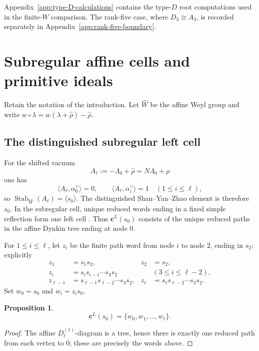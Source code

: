 \documentclass[11pt]{amsart}
\newtheorem{proposition}[theorem]{Proposition}
\theoremstyle{remark}
\numberwithin{equation}{section}
\begin{document}
Appendix~\ref{app:type-D-calculations} contains the type-\(D\) root
computations used in the finite-\(W\) comparison.  The rank-five case, where
\(D_3\cong A_3\), is recorded separately in
Appendix~\ref{app:rank-five-boundary}.

\section{Subregular affine cells and primitive ideals}
\label{sec:subregular-primitive}

Retain the notation of the introduction.  Let \(\widehat W\) be the affine
Weyl group and write
\(w\circ\lambda=w(\lambda+\widehat\rho)-\widehat\rho\).

\subsection{The distinguished subregular left cell}

For the shifted vacuum
\[
   A_\ell:=-\Lambda_0+\widehat\rho=N\Lambda_0+\rho
\]
one has
\[
   \langle A_\ell,\alpha_0^\vee\rangle=0,
   \qquad
   \langle A_\ell,\alpha_i^\vee\rangle=1\quad(1\le i\le\ell),
\]
so \(\operatorname{Stab}_{\widehat W}(A_\ell)=\langle s_0\rangle\).  The
distinguished Shan--Yan--Zhao element is therefore \(s_0\).  In the subregular
cell, unique reduced words ending in a fixed simple reflection form one left
cell \cite[Proposition~5.1]{BezrukavnikovKacKrylov2024}
\cite[Proposition~3.6]{Xu2019}.  Thus \(\mathbf c^L(s_0)\) consists of the
unique reduced paths in the affine Dynkin tree ending at node \(0\).

For \(1\le i\le\ell\), let \(z_i\) be the finite path word from node \(i\)
to node \(2\), ending in \(s_2\); explicitly
\begin{align*}
 z_1&=s_1s_2, & z_2&=s_2,\\
 z_i&=s_i s_{i-1}\cdots s_3s_2 &&(3\le i\le\ell-2),\\
 z_{\ell-1}&=s_{\ell-1}s_{\ell-2}\cdots s_3s_2,
 &z_\ell&=s_\ell s_{\ell-2}\cdots s_3s_2.
\end{align*}
Set \(w_0=s_0\) and \(w_i=z_i s_0\).

\begin{proposition}
\label{prop:subregular-left-cell}
\[
   \mathbf c^L(s_0)=\{w_0,w_1,\ldots,w_\ell\}.
\]
\end{proposition}

\begin{proof}
The affine \(D_\ell^{(1)}\)-diagram is a tree, hence there is exactly one
reduced path from each vertex to \(0\); these are precisely the words above.
\end{proof}
\end{document}

